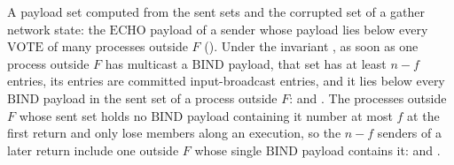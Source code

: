 \begin{definition}
  \label{def:aba-gather-core}
  \leanok
  A payload set computed from the sent sets and the corrupted set of a gather network state: the $\mathrm{ECHO}$ payload of a sender whose payload lies below every $\mathrm{VOTE}$ of many processes outside $F$ ().
  Under the invariant , as soon as one process outside $F$ has multicast a $\mathrm{BIND}$ payload, that set has at least $n-f$ entries, its entries are committed input-broadcast entries, and it lies below every $\mathrm{BIND}$ payload in the sent set of a process outside $F$:  and .
  The processes outside $F$ whose sent set holds no $\mathrm{BIND}$ payload containing it number at most $f$ at the first return and only lose members along an execution, so the $n{-}f$ senders of a later return include one outside $F$ whose single $\mathrm{BIND}$ payload contains it:  and .
\end{definition}
